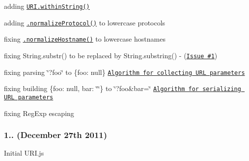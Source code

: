 \begin{DoxyItemize}
\item adding \href{http://medialize.github.io/URI.js/docs.html#static-withinString}{\tt {\ttfamily U\+R\+I.\+within\+String()}}
\item adding \href{http://medialize.github.io/URI.js/docs.html#normalize-protocol}{\tt {\ttfamily .normalize\+Protocol()}} to lowercase protocols
\item fixing \href{http://medialize.github.io/URI.js/docs.html#normalize-host}{\tt {\ttfamily .normalize\+Hostname()}} to lowercase hostnames
\item fixing String.\+substr() to be replaced by String.\+substring() -\/ (\href{https://github.com/medialize/URI.js/issues/1}{\tt Issue \#1})
\item fixing parsing \char`\"{}?foo\char`\"{} to {\ttfamily \{foo\+: null\}} \href{http://dvcs.w3.org/hg/url/raw-file/tip/Overview.html#collect-url-parameters}{\tt Algorithm for collecting U\+RL parameters}
\item fixing building {\ttfamily \{foo\+: null, bar\+: \char`\"{}\char`\"{}\}} to \char`\"{}?foo\&bar=\char`\"{} \href{http://dvcs.w3.org/hg/url/raw-file/tip/Overview.html#url-parameter-serialization}{\tt Algorithm for serializing U\+RL parameters}
\item fixing Reg\+Exp escaping
\end{DoxyItemize}

\subsubsection*{1.. (December 27th 2011)}


\begin{DoxyItemize}
\item Initial U\+R\+I.\+js 
\end{DoxyItemize}